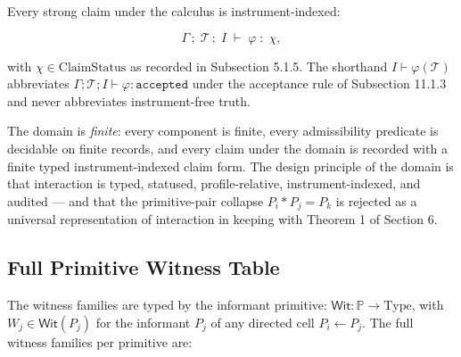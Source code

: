 \documentclass[11pt]{article}
\theoremstyle{definition}
\begin{document}
Every strong claim under the calculus is instrument-indexed:

\[
\Gamma\,;\;\mathcal T\,;\;I\;\vdash\;\varphi\;:\;\chi,
\]

with \(\chi\in\mathrm{ClaimStatus}\) as recorded in Subsection 5.1.5. The shorthand \(I\vdash\varphi(\mathcal T)\) abbreviates \(\Gamma;\mathcal T;I\vdash\varphi:\texttt{accepted}\) under the acceptance rule of Subsection 11.1.3 and never abbreviates instrument-free truth.

The domain is \emph{finite}: every component is finite, every admissibility predicate is decidable on finite records, and every claim under the domain is recorded with a finite typed instrument-indexed claim form. The design principle of the domain is that interaction is typed, statused, profile-relative, instrument-indexed, and audited --- and that the primitive-pair collapse \(P_{i}\ast P_{j}=P_{k}\) is rejected as a universal representation of interaction in keeping with Theorem 1 of Section 6.

\subsection{Full Primitive Witness Table}

The witness families are typed by the informant primitive: \(\mathsf{Wit}:\mathbb P\to\mathrm{Type}\), with \(W_{j}\in\mathsf{Wit}(P_{j})\) for the informant \(P_{j}\) of any directed cell \(P_{i}\leftarrow P_{j}\). The full witness families per primitive are:
\end{document}
